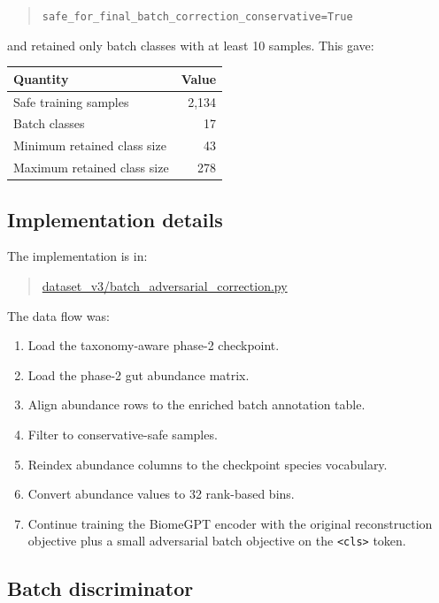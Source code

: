 \documentclass[11pt]{article}
\newcommand{\code}[1]{\texttt{\small #1}}
\newcommand{\filepath}[1]{\begingroup\urlstyle{tt}\small\url{#1}\endgroup}
\begin{document}
\begin{quote}
\code{safe\_for\_final\_batch\_correction\_conservative=True}
\end{quote}

and retained only batch classes with at least 10 samples. This gave:

\begin{center}
\begin{tabular}{lr}
\toprule
Quantity & Value \\
\midrule
Safe training samples & 2,134 \\
Batch classes & 17 \\
Minimum retained class size & 43 \\
Maximum retained class size & 278 \\
\bottomrule
\end{tabular}
\end{center}

\subsection{Implementation details}

The implementation is in:

\begin{quote}
\filepath{dataset_v3/batch_adversarial_correction.py}
\end{quote}

The data flow was:

\begin{enumerate}
  \item Load the taxonomy-aware phase-2 checkpoint.
  \item Load the phase-2 gut abundance matrix.
  \item Align abundance rows to the enriched batch annotation table.
  \item Filter to conservative-safe samples.
  \item Reindex abundance columns to the checkpoint species vocabulary.
  \item Convert abundance values to 32 rank-based bins.
  \item Continue training the BiomeGPT encoder with the original reconstruction objective
  plus a small adversarial batch objective on the \code{<cls>} token.
\end{enumerate}

\subsection{Batch discriminator}
\end{document}
